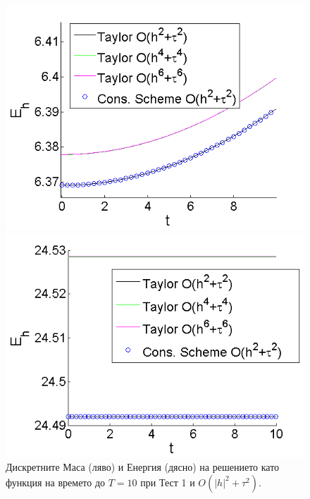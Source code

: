 \documentclass{article}
\begin{document}
\begin{figure}[ht]\vspace{0.2cm}
	\begin{minipage}[b]{0.51\linewidth}
		\includegraphics[width=\linewidth]{Mass/Mass_bt3_c045_h005_Taylor_Conservative.png}
	\end{minipage}	
	\begin{minipage}[b]{0.51\linewidth}
		\includegraphics[width=\linewidth]{Energy/Energy_bt3_c045_h005_Taylor_Conservative.png}	
	\end{minipage}
\caption{Дискретните Маса (ляво) и Енергия (дясно) на решението като функция на времето до $T=10$ при Тест 1 и $O(|h|^2 + \tau^2)$.}
\label{Test1En}
\end{figure}
\end{document}
